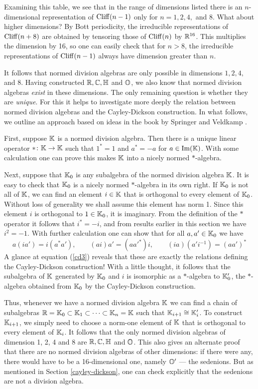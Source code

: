 \noindent 
Examining this table, we see that in the range of dimensions listed
there is an $n$-dimensional representation of ${\rm Cliff}(n-1)$ only for $n
= 1,2,4,$ and $8$.  What about higher dimensions?  By Bott periodicity,
the irreducible representations of ${\rm Cliff}(n+8)$ are obtained by
tensoring those of ${\rm Cliff}(n)$ by ${\mathbb R}^{16}$.  This multiplies the
dimension by 16, so one can easily check that for $n > 8$, the
irreducible representations of ${\rm Cliff}(n-1)$ always have dimension
greater than $n$.  

It follows that normed division algebras are only possible in dimensions  
$1,2,4,$ and $8$.  Having constructed ${\mathbb R},{\mathbb C},{\mathbb H}$ and ${\mathbb O}$, we also know  
that normed division algebras {\it exist} in these dimensions.  The only  
remaining question is whether they are {\it unique}.  For this it helps  
to investigate more deeply the relation between normed division algebras  
and the Cayley-Dickson construction.   In what follows, we outline an  
approach based on ideas in the book by Springer and Veldkamp \cite{SV}.   
  
First, suppose ${\mathbb K}$ is a normed division algebra.  Then there is a unique  
linear operator $\ast \colon {\mathbb K} \to {\mathbb K}$ such that $1^\ast = 1$ and $a^\ast  
= -a$ for $a \in {\rm Im}({\mathbb K})$.  With some calculation one can prove this  
makes ${\mathbb K}$ into a nicely normed $\ast$-algebra.    
  
Next, suppose that ${\mathbb K}_0$ is any subalgebra of the normed division algebra  
${\mathbb K}$.  It is easy to check that ${\mathbb K}_0$ is a nicely normed $\ast$-algebra in  
its own right.  If ${\mathbb K}_0$ is not all of ${\mathbb K}$, we can find an element $i \in 
{\mathbb K}$ that is orthogonal to every element of ${\mathbb K}_0$.   Without loss of 
generality we shall assume this element has norm 1.  Since this element 
$i$ is orthogonal to $1 \in {\mathbb K}_0$, it is imaginary.  From the  definition 
of the $\ast$ operator it follows that $i^\ast = -i$, and from results 
earlier in this section we have $i^2 = -1$.  With  further calculation 
one can show that for all $a,a' \in {\mathbb K}_0$ we have   
\[  a(ia') = i(a^* a') ,  \qquad   
    (ai)a' = (aa'^*)i,      \qquad   
    (ia)(a'i^{-1}) = (aa')^*  \]  
A glance at equation (\ref{cd3}) reveals that these are exactly the  
relations defining the Cayley-Dickson construction!  With a little  
thought, it follows that the subalgebra of ${\mathbb K}$ generated by ${\mathbb K}_0$ and $i$  
is isomorphic as a $\ast$-algebra to ${\mathbb K}'_0$, the $\ast$-algebra obtained  
from ${\mathbb K}_0$ by the Cayley-Dickson construction.  
  
Thus, whenever we have a normed division algebra ${\mathbb K}$ we can find a 
chain of subalgebras ${\mathbb R} = {\mathbb K}_0 \subset {\mathbb K}_1 \subset \cdots \subset 
{\mathbb K}_n = {\mathbb K}$ such that ${\mathbb K}_{i+1} \cong {\mathbb K}_i'$.  To construct ${\mathbb K}_{i+1}$, we 
simply need to choose a norm-one element of ${\mathbb K}$ that is orthogonal to 
every element of ${\mathbb K}_i$.    It follows that the only normed division 
algebras of dimension 1, 2, 4 and 8 are ${\mathbb R},{\mathbb C},{\mathbb H}$ and ${\mathbb O}$.   This also 
gives an alternate proof that there are no normed division algebras of 
other dimensions: if there were any, there would have to be a 
16-dimensional one, namely ${\mathbb O}'$ --- the sedenions.  But as mentioned
in Section \ref{cayley-dickson}, one can check explicitly that the 
sedenions are not a division algebra.    

